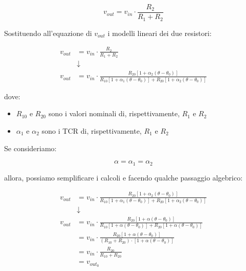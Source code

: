 {
    \Large 
    \begin{equation}
        v_{out}
        = 
        v_{in}
        \cdot 
        \frac{R_2}{R_1 + R_2}
    \end{equation}
}

Sostituendo all'equazione di $v_{out}$ i modelli lineari dei due resistori: 

{
    \Large 
    \begin{equation}
        \begin{split}
        v_{out}
        &= 
        v_{in}
        \cdot 
        \frac{R_2}{R_1 + R_2} 
        \\
        &\downarrow
        \\
        v_{out}
        &=
        v_{in}
        \cdot 
        \frac{ R_{20} [1 + \alpha_2 (\theta - \theta_0)]}{R_{10} [1 + \alpha_1 (\theta - \theta_0)] + R_{20} [1 + \alpha_2 (\theta - \theta_0)]}
        \end{split}
    \end{equation}
}

dove: 

\begin{itemize}
    \item $R_{10}$ e $R_{20}$ sono i valori nominali di, rispettivamente, $R_1$ e $R_2$
    \item $\alpha_1$ e $\alpha_2$ sono i TCR di, rispettivamente, $R_1$ e $R_2$
\end{itemize}


Se consideriamo: 

{
    \Large 
    \begin{equation}
        \alpha = \alpha_1 = \alpha_2
    \end{equation}
}

allora, possiamo semplificare i calcoli e facendo qualche passaggio algebrico: 

{
    \Large 
    \begin{equation}
        \begin{split}
        v_{out}
        &=
        v_{in}
        \cdot 
        \frac{ R_{20} [1 + \alpha_2 (\theta - \theta_0)]}{R_{10} [1 + \alpha_1 (\theta - \theta_0)] + R_{20} [1 + \alpha_2 (\theta - \theta_0)]} 
        \\
        &\downarrow
        \\
        v_{out}
        &=
        v_{in}
        \cdot 
        \frac{ R_{20} [1 + \alpha (\theta - \theta_0)]}{R_{10} [1 + \alpha (\theta - \theta_0)] + R_{20} [1 + \alpha (\theta - \theta_0)]} 
        \\
        &=
        v_{in}
        \cdot 
        \frac{ R_{20} [1 + \alpha (\theta - \theta_0)]}{(R_{10} + R_{20}) \cdot [1 + \alpha (\theta - \theta_0)] } 
        \\
        &= 
        v_{in}
        \cdot 
        \frac{R_{20}}{R_{10} + R_{20}}
        \\
        &=
        v_{out_0}
    \end{split}
    \end{equation}
}


